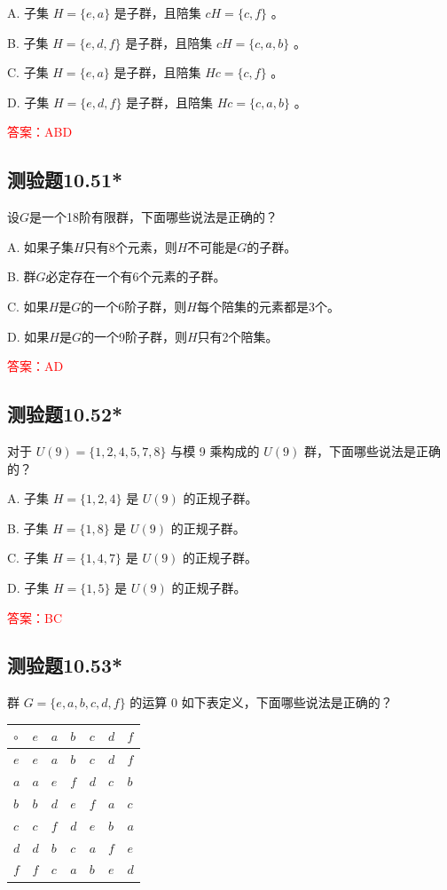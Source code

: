 \documentclass[UTF8, heading=true]{ctexart}
\begin{document}
A. 子集 $H=\{e, a\}$ 是子群，且陪集 $c H=\{c, f\}$ 。

B. 子集 $H=\{e, d, f\}$ 是子群，且陪集 $c H=\{c, a, b\}$ 。

C. 子集 $H=\{e, a\}$ 是子群，且陪集 $H c=\{c, f\}$ 。

D. 子集 $H=\{e, d, f\}$ 是子群，且陪集 $H c=\{c, a, b\}$ 。

\textcolor{red}{答案：ABD}

\subsection{测验题10.51*}

设$G$是一个18阶有限群，下面哪些说法是正确的？

A. 如果子集$H$只有8个元素，则$H$不可能是$G$的子群。

B. 群$G$必定存在一个有6个元素的子群。

C. 如果$H$是$G$的一个6阶子群，则$H$每个陪集的元素都是3个。

D. 如果$H$是$G$的一个9阶子群，则$H$只有2个陪集。

\textcolor{red}{答案：AD}

\subsection{测验题10.52*}

对于 $U(9)=\{1,2,4,5,7,8\}$ 与模 9 乘构成的 $U(9)$ 群，下面哪些说法是正确的？

A. 子集 $H=\{1,2,4\}$ 是 $U(9)$ 的正规子群。

B. 子集 $H=\{1,8\}$ 是 $U(9)$ 的正规子群。

C. 子集 ${H}=\{1,4,7\}$ 是 ${U}(9)$ 的正规子群。

D. 子集 $H=\{1,5\}$ 是 $U(9)$ 的正规子群。

\textcolor{red}{答案：BC}

\subsection{测验题10.53*}

群 $G=\{e, a, b, c, d, f\}$ 的运算 0 如下表定义，下面哪些说法是正确的？

\begin{table}[H]
  \renewcommand{\arraystretch}{1.5}
  \centering
\begin{tabular}{l|llllll}
\hline$\circ$ & $e$ & $a$ & $b$ & $c$ & $d$ & $f$ \\
\hline$e$ & $e$ & $a$ & $b$ & $c$ & $d$ & $f$ \\
$a$ & $a$ & $e$ & $f$ & $d$ & $c$ & $b$ \\
$b$ & $b$ & $d$ & $e$ & $f$ & $a$ & $c$ \\
$c$ & $c$ & $f$ & $d$ & $e$ & $b$ & $a$ \\
$d$ & $d$ & $b$ & $c$ & $a$ & $f$ & $e$ \\
$f$ & $f$ & $c$ & $a$ & $b$ & $e$ & $d$ \\
\hline
\end{tabular}
\end{table}
\end{document}
